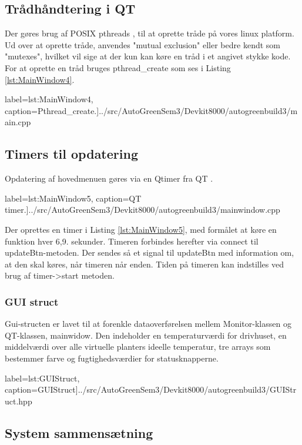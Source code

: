 \subsection{Trådhåndtering i QT} \label{sec:trådehåndtering}

Der gøres brug af POSIX pthreads \cite{lib:multi_threading}, til at oprette tråde på vores linux platform. Ud over at oprette tråde, anvendes "mutual exclusion" eller bedre kendt som "mutexes", hvilket vil sige at der kun kan køre en tråd i et angivet stykke kode. For at oprette en tråd bruges pthread\_create som ses i Listing \ref{lst:MainWindow4}.

 label=lst:MainWindow4, caption=Pthread\_create.]{../src/AutoGreenSem3/Devkit8000/autogreenbuild3/main.cpp}

\subsection{Timers til opdatering}

Opdatering af hovedmenuen gøres via en Qtimer fra QT \cite{lib:QT}.

 label=lst:MainWindow5, caption=QT timer.]{../src/AutoGreenSem3/Devkit8000/autogreenbuild3/mainwindow.cpp}

Der oprettes en timer i Listing \ref{lst:MainWindow5}, med formålet at køre en funktion hver 6,9. sekunder. Timeren forbindes herefter via connect til updateBtn-metoden. Der sendes så et signal til updateBtn med information om, at den skal køres, når timeren når enden. Tiden på timeren kan indstilles ved brug af timer->start metoden.

\subsubsection{GUI struct}

Gui-structen er lavet til at forenkle dataoverførelsen mellem Monitor-klassen og QT-klassen, mainwidow. Den indeholder en temperaturværdi for drivhuset, en middelværdi over alle virtuelle planters ideelle temperatur, tre arrays som bestemmer farve og fugtighedsværdier for statusknapperne.

 label=lst:GUIStruct, caption=GUIStruct]{../src/AutoGreenSem3/Devkit8000/autogreenbuild3/GUIStruct.hpp}

\subsection{System sammensætning}

